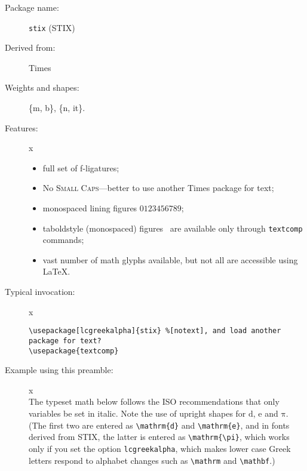 \documentclass{article}
\def\Pr{\ensuremath{\mathbb{P}}}
\def\d{\mathrm{d}}
\begin{document}
\thispagestyle{empty}
\begin{description}
\item[Package name:] {\tt stix} (STIX)
\item[Derived from:] Times
\item[Weights and shapes:]  \{m, b\}, \{n, it\}. 
\item[Features:]{\color{white}x}\\[-15pt]  
\begin{itemize}
\item
full set of f-ligatures;
\item No \textsc{Small Caps}---better to use another Times package for text;
\item monospaced lining figures $0123456789$;
\item taboldstyle (monospaced) figures \textzerooldstyle\textoneoldstyle\texttwooldstyle\textthreeoldstyle\textfouroldstyle\textfiveoldstyle\textsixoldstyle\textsevenoldstyle\texteightoldstyle\textnineoldstyle\ are available only through {\tt textcomp} commands;
\item vast number of math glyphs available, but not all are accessible using \LaTeX. 
\end{itemize}
\item[Typical invocation:]{\color{white}x}
\begin{verbatim}
\usepackage[lcgreekalpha]{stix} %[notext], and load another package for text?
\usepackage{textcomp}
\end{verbatim}
\item[Example using this preamble:]{\color{white}x}\\[6pt]
\lipsum[1]
\def\Pr{\ensuremath{\mathbb{P}}}
\def\d{\mathrm{d}}
The typeset math below follows the ISO recommendations that only variables
be set in italic. Note the use of upright shapes for $\d$, $\mathrm{e}$
and $\mathrm{\pi}$. (The first two are entered as \verb|\mathrm{d}| and
\verb|\mathrm{e}|, and in fonts derived from STIX,
 the latter is entered as \verb|\mathrm{\pi}|, which works only if you set the option {\tt lcgreekalpha}, which makes lower case Greek letters respond to alphabet changes such as \verb|\mathrm| and \verb|\mathbf|.)


\end{description}
\end{document}
